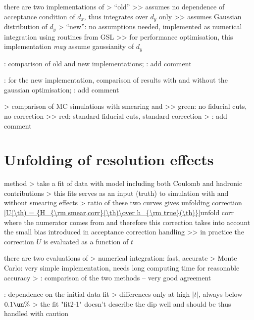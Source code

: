 \> there are two implementations of 
\>> ``old''
\>>> assumes no dependence of acceptance condition of $d_x$, thus integrates over $d_y$ only
\>>> assumes Gaussian distribution of $d_y$
\>> ``new'': no assumptions needed, implemented as numerical integration using routines from GSL
\>>> for performance optimisation, this implementation {\it may} assume gaussianity of $d_y$

\>  : comparison of old and new implementations; \TODO: add comment

\>  : for the new implementation, comparison of results with and without the gaussian optimisation; \TODO: add comment

\> 
\>> comparison of MC simulations with smearing and
\>>> green: no fiducial cuts, no correction
\>>> red: standard fiducial cuts, standard correction
\>> \TODO: add comment




\section{Unfolding of resolution effects}

\> method
\>> take a fit of data with model including both Coulomb and hadronic contributions
\>> this fits serves as an input (truth) to simulation with and without smearing effects
\>> ratio of these two curves gives unfolding correction
\eqref{U(\th) = {H_{\rm smear,corr}(\th)\over h_{\rm true}(\th)}}{unfold corr}
where the numerator comes from  and therefore this correction takes into account the small bias introduced in acceptance correction handling
\>>> in practice the correction $U$ is evaluated as a function of $t$

\> there are two evaluations of 
\>> numerical integration: fast, accurate
\>> Monte Carlo: very simple implementation, needs long computing time for reasonable accuracy
\>>  : comparison of the two methods -- very good agreement

\>  : dependence on the initial data fit
\>> differences only at high $|t|$, always below $0.1\un{\%}$
\>> the fit "fit2-1" doesn't describe the dip well and should be thus handled with caution

